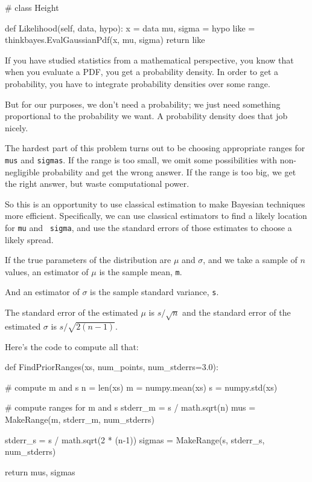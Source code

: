 \documentclass[12pt]{book}
\theoremstyle{exercise}
\begin{document}
\begin{code}
# class Height

    def Likelihood(self, data, hypo):
        x = data
        mu, sigma = hypo
        like = thinkbayes.EvalGaussianPdf(x, mu, sigma)
        return like
\end{code}

If you have studied statistics from a mathematical perspective,
you know that when you evaluate a PDF, you get a probability
density.  In order to get a probability, you have to integrate
probability densities over some range.

But for our purposes, we don't need a probability; we just
need something proportional to the probability we want.
A probability density does that job nicely.

The hardest part of this problem turns
out to be choosing appropriate ranges for {\tt mus} and
{\tt sigmas}.  If the range is too small, we omit some
possibilities with non-negligible probability and get the
wrong answer.  If the range is too big, we get the right answer,
but waste computational power.

So this is an opportunity to use classical estimation to
make Bayesian techniques more efficient.  Specifically, we can use
classical estimators to find a likely location for {\tt mu} and {\tt
  sigma}, and use the standard errors of those estimates to choose a
likely spread.

If the true parameters of the distribution are $\mu$ and $\sigma$, and
we take a sample of $n$ values, an estimator of $\mu$ is the sample
mean, {\tt m}.

And an estimator of $\sigma$ is the sample standard
variance, {\tt s}.

The standard error of the estimated $\mu$ is $s / \sqrt{n}$
and the standard error of the estimated $\sigma$ is
$s / \sqrt{2 (n-1)}$.

Here's the code to compute all that:

\begin{code}
def FindPriorRanges(xs, num_points, num_stderrs=3.0):

    # compute m and s
    n = len(xs)
    m = numpy.mean(xs)
    s = numpy.std(xs)

    # compute ranges for m and s
    stderr_m = s / math.sqrt(n)
    mus = MakeRange(m, stderr_m, num_stderrs)

    stderr_s = s / math.sqrt(2 * (n-1))
    sigmas = MakeRange(s, stderr_s, num_stderrs)

    return mus, sigmas
\end{code}
\end{document}
